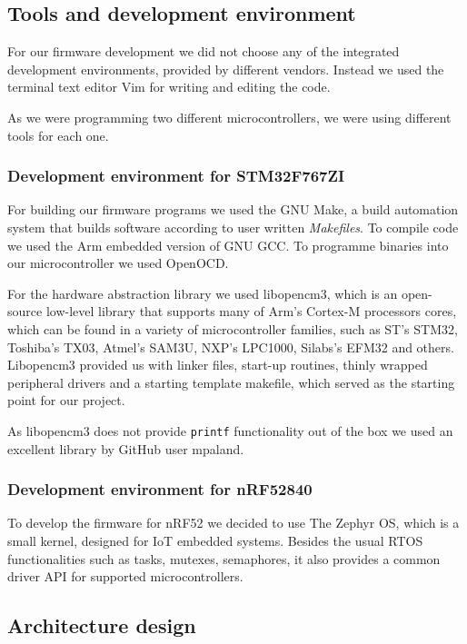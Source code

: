 \subsection{ Tools and development environment}

For our firmware development we did not choose any of the integrated development environments, provided by different vendors.
Instead we used the terminal text editor Vim for writing and editing the code.

As we were programming two different microcontrollers, we were using different tools for each one.


\subsubsection{ Development environment for STM32F767ZI}

For building our firmware programs we used the GNU Make, a build automation system that builds software according to user written \textit{Makefiles}.
To compile code we used the Arm embedded version of GNU GCC.
To programme binaries into our microcontroller we used OpenOCD.

For the hardware abstraction library we used libopencm3, which is an open-source low-level library that supports many of Arm's Cortex-M processors cores, which can be found in a variety of microcontroller families, such as ST's STM32, Toshiba's TX03, Atmel's SAM3U, NXP's LPC1000, Silabs's EFM32 and others.
Libopencm3 provided us with linker files, start-up routines, thinly wrapped peripheral drivers and a starting template makefile, which served as the starting point for our project.

As libopencm3 does not provide \verb|printf| functionality out of the box we used an excellent library by GitHub user mpaland\cite{printf_lib}.


\subsubsection{ Development environment for nRF52840}

To develop the firmware for nRF52 we decided to use The Zephyr OS, which is a small kernel, designed for IoT embedded systems.
Besides the usual RTOS functionalities such as tasks, mutexes, semaphores, it also provides a common driver API for supported microcontrollers.


\subsection{ Architecture design}

